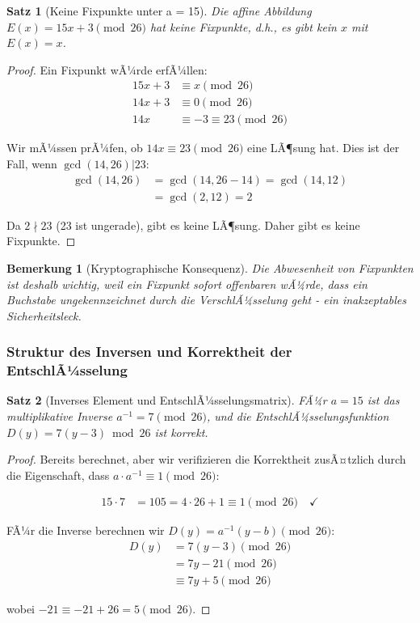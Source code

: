 ﻿\documentclass[12pt,a4paper]{article}
\newtheorem{theorem}{Satz}
\newtheorem{remark}{Bemerkung}
\begin{document}
	\begin{theorem}[Keine Fixpunkte unter a = 15]
		Die affine Abbildung $E(x) = 15x + 3 \pmod{26}$ hat keine Fixpunkte, d.h., es gibt kein $x$ mit $E(x) = x$.
	\end{theorem}
	
	\begin{proof}
		Ein Fixpunkt wÃ¼rde erfÃ¼llen:
		\begin{align}
			15x + 3 &\equiv x \pmod{26} \\
			14x + 3 &\equiv 0 \pmod{26} \\
			14x &\equiv -3 \equiv 23 \pmod{26}
		\end{align}
		
		Wir mÃ¼ssen prÃ¼fen, ob $14x \equiv 23 \pmod{26}$ eine LÃ¶sung hat. Dies ist der Fall, wenn $\gcd(14, 26) | 23$:
		\begin{align}
			\gcd(14, 26) &= \gcd(14, 26 - 14) = \gcd(14, 12) \\
			&= \gcd(2, 12) = 2
		\end{align}
		
		Da $2 \nmid 23$ (23 ist ungerade), gibt es keine LÃ¶sung. Daher gibt es keine Fixpunkte. \checkmark
	\end{proof}
	
	\begin{remark}[Kryptographische Konsequenz]
		Die Abwesenheit von Fixpunkten ist deshalb wichtig, weil ein Fixpunkt sofort offenbaren wÃ¼rde, dass ein Buchstabe ungekennzeichnet durch die VerschlÃ¼sselung geht - ein inakzeptables Sicherheitsleck.
	\end{remark}
	
	\subsubsection{Struktur des Inversen und Korrektheit der EntschlÃ¼sselung}
	
	\begin{theorem}[Inverses Element und EntschlÃ¼sselungsmatrix]
		FÃ¼r $a = 15$ ist das multiplikative Inverse $a^{-1} = 7 \pmod{26}$, und die EntschlÃ¼sselungsfunktion $D(y) = 7(y - 3) \bmod 26$ ist korrekt.
	\end{theorem}
	
	\begin{proof}
		Bereits berechnet, aber wir verifizieren die Korrektheit zusÃ¤tzlich durch die Eigenschaft, dass $a \cdot a^{-1} \equiv 1 \pmod{26}$:
		
		\begin{align}
			15 \cdot 7 &= 105 = 4 \cdot 26 + 1 \equiv 1 \pmod{26} \quad \checkmark
		\end{align}
		
		FÃ¼r die Inverse berechnen wir $D(y) = a^{-1}(y - b) \pmod{26}$:
		\begin{align}
			D(y) &= 7(y - 3) \pmod{26} \\
			&= 7y - 21 \pmod{26} \\
			&\equiv 7y + 5 \pmod{26}
		\end{align}
		
		wobei $-21 \equiv -21 + 26 = 5 \pmod{26}$.
	\end{proof}
	
\end{document}
